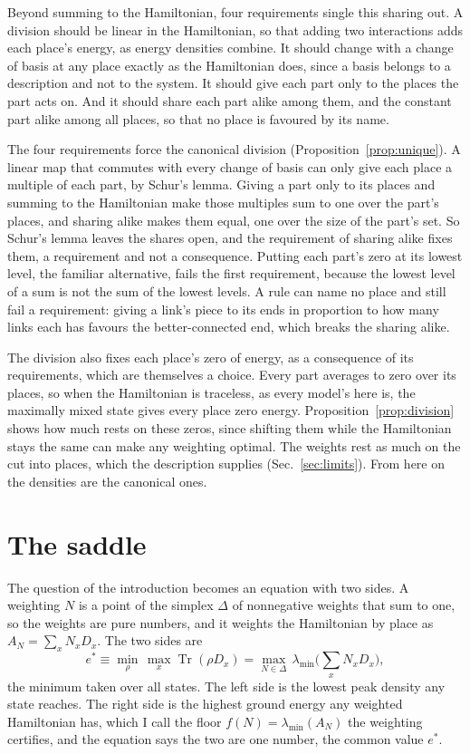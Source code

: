 \documentclass[aps,prd,reprint,superscriptaddress]{revtex4-2}
\begin{document}
Beyond summing to the Hamiltonian, four requirements single this sharing out. A division should be linear in the Hamiltonian, so that adding two interactions adds each place's energy, as energy densities combine. It should change with a change of basis at any place exactly as the Hamiltonian does, since a basis belongs to a description and not to the system. It should give each part only to the places the part acts on. And it should share each part alike among them, and the constant part alike among all places, so that no place is favoured by its name.

The four requirements force the canonical division (Proposition~\ref{prop:unique}). A linear map that commutes with every change of basis can only give each place a multiple of each part, by Schur's lemma. Giving a part only to its places and summing to the Hamiltonian make those multiples sum to one over the part's places, and sharing alike makes them equal, one over the size of the part's set. So Schur's lemma leaves the shares open, and the requirement of sharing alike fixes them, a requirement and not a consequence. Putting each part's zero at its lowest level, the familiar alternative, fails the first requirement, because the lowest level of a sum is not the sum of the lowest levels. A rule can name no place and still fail a requirement: giving a link's piece to its ends in proportion to how many links each has favours the better-connected end, which breaks the sharing alike.

The division also fixes each place's zero of energy, as a consequence of its requirements, which are themselves a choice. Every part averages to zero over its places, so when the Hamiltonian is traceless, as every model's here is, the maximally mixed state gives every place zero energy. Proposition~\ref{prop:division} shows how much rests on these zeros, since shifting them while the Hamiltonian stays the same can make any weighting optimal. The weights rest as much on the cut into places, which the description supplies (Sec.~\ref{sec:limits}). From here on the densities are the canonical ones.

\section{The saddle}
\label{sec:saddle}

The question of the introduction becomes an equation with two sides. A weighting $N$ is a point of the simplex $\Delta$ of nonnegative weights that sum to one, so the weights are pure numbers, and it weights the Hamiltonian by place as $A_N = \sum_x N_x D_x$. The two sides are
\begin{equation}
  e^* \equiv \min_{\rho}\,\max_x \operatorname{Tr}(\rho D_x) = \max_{N\in\Delta}\,\lambda_{\min}\Big(\sum_x N_x D_x\Big),
  \label{eq:saddle}
\end{equation}
the minimum taken over all states. The left side is the lowest peak density any state reaches. The right side is the highest ground energy any weighted Hamiltonian has, which I call the floor $f(N) = \lambda_{\min}(A_N)$ the weighting certifies, and the equation says the two are one number, the common value $e^*$.
\end{document}
